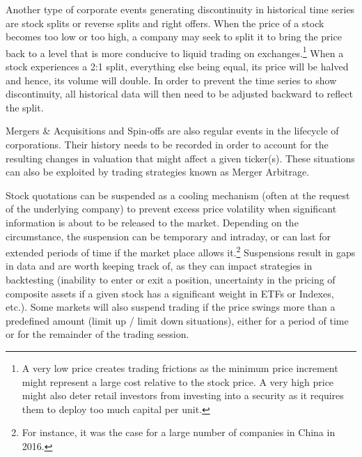 \begin{itemize}
Another type of corporate events generating discontinuity in historical time series are stock splits or reverse splits and right offers. When the price of a stock becomes too low or too high, a company may seek to split it to bring the price back to a level that is more conducive to liquid trading on exchanges.\footnote{A very low price creates trading frictions as the minimum price increment might represent a large cost relative to the stock price. A very high price might also deter retail investors from investing into a security as it requires them to deploy too much capital per unit.} When a stock experiences a 2:1 split, everything else being equal, its price will be halved and hence, its volume will double. In order to prevent the time series to show discontinuity, all historical data will then need to be adjusted backward to reflect the split.


Mergers \& Acquisitions and Spin-offs are also regular events in the lifecycle of corporations. Their history needs to be recorded in order to account for the resulting changes in valuation that might affect a given ticker(s). These situations can also be exploited by trading strategies known as Merger Arbitrage.


Stock quotations can be suspended as a cooling mechanism (often at the request of the underlying company) to prevent excess price volatility when significant information is about to be released to the market. Depending on the circumstance, the suspension can be temporary and intraday, or can last for extended periods of time if the market place allows it.\footnote{For instance, it was the case for a large number of companies in China in 2016.} Suspensions result in gaps in data and are worth keeping track of, as they can impact strategies in backtesting (inability to enter or exit a position, uncertainty in the pricing of composite assets if a given stock has a significant weight in ETFs or Indexes, etc.). Some markets will also suspend trading if the price swings more than a predefined amount (limit up / limit down situations), either for a period of time or for the remainder of the trading session.



\end{itemize}
